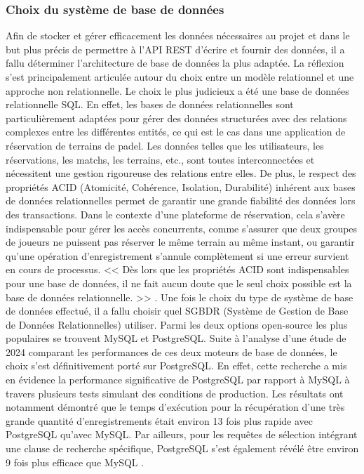 \documentclass[12pt]{article}
\begin{document}
\subsubsection{Choix du système de base de données}
Afin de stocker et gérer efficacement les données nécessaires au projet et dans le but plus précis de permettre à l'API REST d'écrire et fournir des données, il a fallu déterminer l'architecture de base de données la plus adaptée. La réflexion s'est principalement articulée autour du choix entre un modèle relationnel et une approche non relationnelle.
\newline\newline
Le choix le plus judicieux a été une base de données relationnelle SQL. En effet, les bases de données relationnelles sont particulièrement adaptées pour gérer des données structurées avec des relations complexes entre les différentes entités, ce qui est le cas dans une application de réservation de terrains de padel. Les données telles que les utilisateurs, les réservations, les matchs, les terrains, etc., sont toutes interconnectées et nécessitent une gestion rigoureuse des relations entre elles.
\newline\newline
De plus, le respect des propriétés ACID (Atomicité, Cohérence, Isolation, Durabilité) inhérent aux bases de données relationnelles permet de garantir une grande fiabilité des données lors des transactions. Dans le contexte d'une plateforme de réservation, cela s'avère indispensable pour gérer les accès concurrents, comme s'assurer que deux groupes de joueurs ne puissent pas réserver le même terrain au même instant, ou garantir qu'une opération d'enregistrement s'annule complètement si une erreur survient en cours de processus.
\newline\newline
<< Dès lors que les propriétés ACID sont indispensables pour une base de données, il ne fait aucun doute que le seul choix possible est la base de données relationnelle. >> \parencite[trad. de][p.~220]{sahatqija_comparison_2018}.
\newline\newline
Une fois le choix du type de système de base de données effectué, il a fallu choisir quel SGBDR (Système de Gestion de Base de Données Relationnelles) utiliser. Parmi les deux options open-source les plus populaires se trouvent MySQL et PostgreSQL.
\newline\newline
Suite à l'analyse d'une étude de 2024 comparant les performances de ces deux moteurs de base de données, le choix s'est définitivement porté sur PostgreSQL. En effet, cette recherche a mis en évidence la performance significative de PostgreSQL par rapport à MySQL à travers plusieurs tests simulant des conditions de production. Les résultats ont notamment démontré que le temps d'exécution pour la récupération d'une très grande quantité d'enregistrements était environ 13 fois plus rapide avec PostgreSQL qu'avec MySQL. Par ailleurs, pour les requêtes de sélection intégrant une clause de recherche spécifique, PostgreSQL s'est également révélé être environ 9 fois plus efficace que MySQL \parencite{salunke_performance_2024}.
\end{document}
